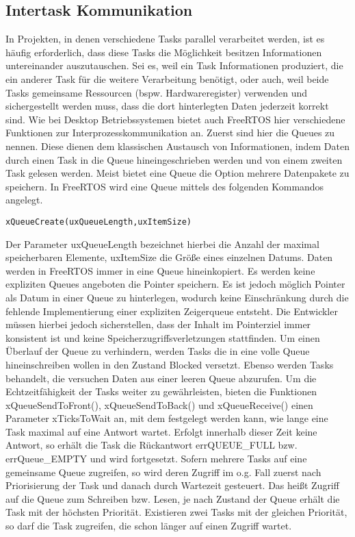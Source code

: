 \subsection{Intertask Kommunikation}
In Projekten, in denen verschiedene Tasks parallel verarbeitet werden, ist es häufig erforderlich, dass diese Tasks die Möglichkeit besitzen Informationen untereinander auszutauschen. Sei es, weil ein Task Informationen produziert, die ein anderer Task für die weitere Verarbeitung benötigt, oder auch, weil beide Tasks gemeinsame Ressourcen (bspw. Hardwareregister) verwenden und sichergestellt werden muss, dass die dort hinterlegten Daten jederzeit korrekt sind. Wie bei Desktop Betriebssystemen bietet auch FreeRTOS hier verschiedene Funktionen zur Interprozesskommunikation an. Zuerst sind hier die Queues zu nennen. Diese dienen dem klassischen Austausch von Informationen, indem Daten durch einen Task in die Queue hineingeschrieben werden und von einem zweiten Task gelesen werden. Meist bietet eine Queue die Option mehrere Datenpakete zu speichern. In FreeRTOS wird eine Queue mittels des folgenden Kommandos angelegt. 
\begin{lstlisting}[numbers = none]
xQueueCreate(uxQueueLength,uxItemSize)
\end{lstlisting}
Der Parameter uxQueueLength bezeichnet hierbei die Anzahl der maximal speicherbaren Elemente, uxItemSize die Größe eines einzelnen Datums. Daten werden in FreeRTOS immer in eine Queue hineinkopiert. 
Es werden keine expliziten Queues angeboten die Pointer speichern. Es ist jedoch möglich Pointer als Datum in einer Queue zu hinterlegen, wodurch keine Einschränkung durch die fehlende Implementierung einer expliziten Zeigerqueue entsteht. Die Entwickler müssen hierbei jedoch sicherstellen, dass der Inhalt im Pointerziel immer konsistent ist und keine Speicherzugriffsverletzungen stattfinden.
Um einen Überlauf der Queue zu verhindern, werden Tasks die in eine volle Queue hineinschreiben wollen in den Zustand Blocked versetzt. Ebenso werden Tasks behandelt, die versuchen Daten aus einer leeren Queue abzurufen. Um die Echtzeitfähigkeit der Tasks weiter zu gewährleisten, bieten die Funktionen xQueueSendToFront(), xQueueSendToBack() und xQueueReceive() einen Parameter xTicksToWait an, mit dem festgelegt werden kann, wie lange eine Task maximal auf eine Antwort wartet. Erfolgt innerhalb dieser Zeit keine Antwort, so erhält die Task die Rückantwort errQUEUE\_FULL bzw. errQueue\_EMPTY und wird fortgesetzt. 
Sofern mehrere Tasks auf eine gemeinsame Queue zugreifen, so wird deren Zugriff im o.g. Fall zuerst nach Priorisierung der Task und danach durch Wartezeit gesteuert. Das heißt Zugriff auf die Queue zum Schreiben bzw. Lesen, je nach Zustand der Queue erhält die Task mit der höchsten Priorität. Existieren zwei Tasks mit der gleichen Priorität, so darf die Task zugreifen, die schon länger auf einen Zugriff wartet.
